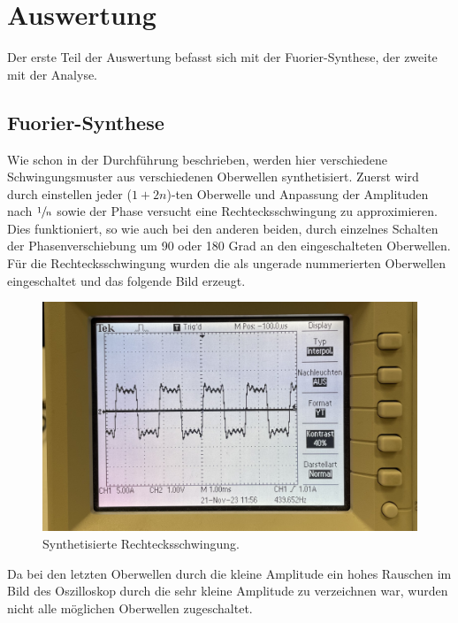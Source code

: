 \section{Auswertung}
Der erste Teil der Auswertung befasst sich mit der Fuorier-Synthese, der zweite mit der Analyse.
\label{sec:Auswertung}
\subsection{Fuorier-Synthese}
Wie schon in der Durchführung beschrieben, werden hier verschiedene Schwingungsmuster aus verschiedenen Oberwellen 
synthetisiert. Zuerst wird durch einstellen jeder ($1+2n$)-ten Oberwelle und Anpassung der Amplituden nach 
$\sfrac{1}{n}$ sowie der Phase versucht eine Rechtecksschwingung zu approximieren.
Dies funktioniert, so wie auch bei den anderen beiden, durch einzelnes Schalten der Phasenverschiebung um 90 oder 
180 Grad an den eingeschalteten Oberwellen.\\ \noindent
Für die Rechtecksschwingung wurden die als ungerade nummerierten Oberwellen eingeschaltet und das folgende Bild erzeugt.
\begin{figure}[H]
  \centering
  \includegraphics[scale=0.06]{Messdaten_Bilder/Rechtecksschwingung.jpeg}
  \caption{Synthetisierte Rechtecksschwingung.}
  \label{fig:Rechtecksschwingung}
\end{figure}\noindent
Da bei den letzten Oberwellen durch die kleine Amplitude ein hohes Rauschen im Bild des Oszilloskop durch die sehr kleine 
Amplitude zu verzeichnen war, wurden nicht alle möglichen Oberwellen zugeschaltet.
